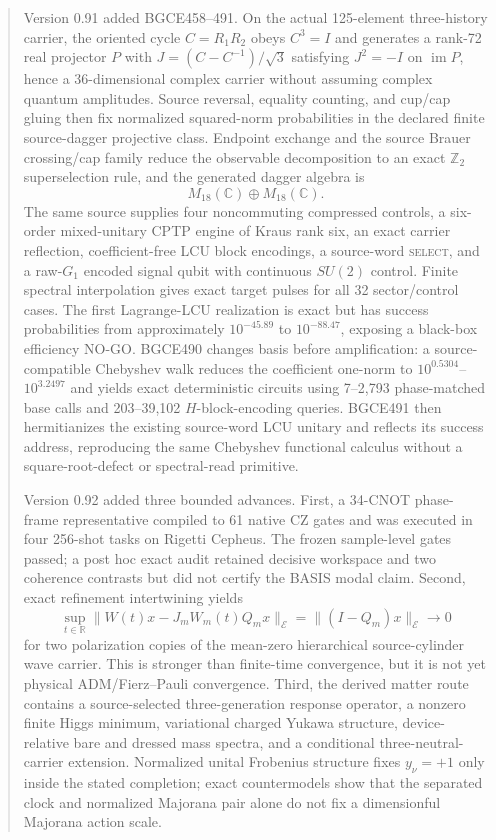 \documentclass[11pt]{article}
\theoremstyle{definition}
\theoremstyle{remark}
\begin{document}
\begin{abstract}
Version 0.91 added BGCE458--491. On the actual 125-element three-history carrier, the oriented cycle $C=R_1R_2$ obeys $C^3=I$ and generates a rank-72 real projector $P$ with $J=(C-C^{-1})/\sqrt3$ satisfying $J^2=-I$ on $\operatorname{im}P$, hence a 36-dimensional complex carrier without assuming complex quantum amplitudes. Source reversal, equality counting, and cup/cap gluing then fix normalized squared-norm probabilities in the declared finite source-dagger projective class. Endpoint exchange and the source Brauer crossing/cap family reduce the observable decomposition to an exact $\mathbb Z_2$ superselection rule, and the generated dagger algebra is
\[
M_{18}(\mathbb C)\oplus M_{18}(\mathbb C).
\]
The same source supplies four noncommuting compressed controls, a six-order mixed-unitary CPTP engine of Kraus rank six, an exact carrier reflection, coefficient-free LCU block encodings, a source-word \textsc{select}, and a raw-$G_1$ encoded signal qubit with continuous $SU(2)$ control. Finite spectral interpolation gives exact target pulses for all 32 sector/control cases. The first Lagrange-LCU realization is exact but has success probabilities from approximately $10^{-45.89}$ to $10^{-88.47}$, exposing a black-box efficiency NO-GO. BGCE490 changes basis before amplification: a source-compatible Chebyshev walk reduces the coefficient one-norm to $10^{0.5304}$--$10^{3.2497}$ and yields exact deterministic circuits using 7--2,793 phase-matched base calls and 203--39,102 $H$-block-encoding queries. BGCE491 then hermitianizes the existing source-word LCU unitary and reflects its success address, reproducing the same Chebyshev functional calculus without a square-root-defect or spectral-read primitive.

Version 0.92 added three bounded advances. First, a 34-CNOT phase-frame representative compiled to 61 native CZ gates and was executed in four 256-shot tasks on Rigetti Cepheus. The frozen sample-level gates passed; a post hoc exact audit retained decisive workspace and two coherence contrasts but did not certify the BASIS modal claim. Second, exact refinement intertwining yields
\[
 \sup_{t\in\mathbb R}\lVert W(t)x-J_mW_m(t)Q_mx\rVert_{\mathcal E}
 =\lVert(I-Q_m)x\rVert_{\mathcal E}\longrightarrow0
\]
for two polarization copies of the mean-zero hierarchical source-cylinder wave carrier. This is stronger than finite-time convergence, but it is not yet physical ADM/Fierz--Pauli convergence. Third, the derived matter route contains a source-selected three-generation response operator, a nonzero finite Higgs minimum, variational charged Yukawa structure, device-relative bare and dressed mass spectra, and a conditional three-neutral-carrier extension. Normalized unital Frobenius structure fixes $y_\nu=+1$ only inside the stated completion; exact countermodels show that the separated clock and normalized Majorana pair alone do not fix a dimensionful Majorana action scale.


\end{abstract}
\end{document}
